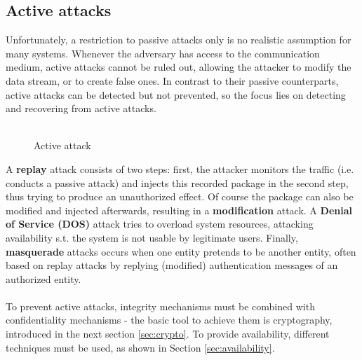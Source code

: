 \subsection{Active attacks}
Unfortunately, a restriction to passive attacks only is no realistic assumption for many systems. Whenever the adversary has access to the communication medium, active attacks
cannot be ruled out, allowing the attacker to modify the data stream, or to create false ones. In contrast to their passive counterparts, active attacks can be detected but
not prevented, so the focus lies on detecting and recovering from active attacks.
\\
\\
\begin{figure}[hf]
\centering
{}
\label{fig:actAttack}
\caption{Active attack}
\end{figure}
A \textbf{replay} attack consists of two steps: first, the attacker monitors the traffic (i.e. conducts a passive attack) and injects this recorded package in the second step,
thus trying to produce an unauthorized effect.
Of course the package can also be modified and injected afterwards, resulting in a \textbf{modification} attack.
A \textbf{Denial of Service (DOS)} attack tries to overload system resources, attacking availability s.t. the system is not
usable by legitimate users. Finally, \textbf{masquerade} attacks occurs when one entity pretends to be another entity, often based on replay attacks by replying (modified)
authentication messages of an authorized entity.
\\
\\
To prevent active attacks, integrity mechanisms must be combined with confidentiality mechanisms - 
the basic tool to achieve them is cryptography, introduced in the next section \ref{sec:crypto}. To provide availability, different techniques must be used,
as shown in Section \ref{sec:availability}.

